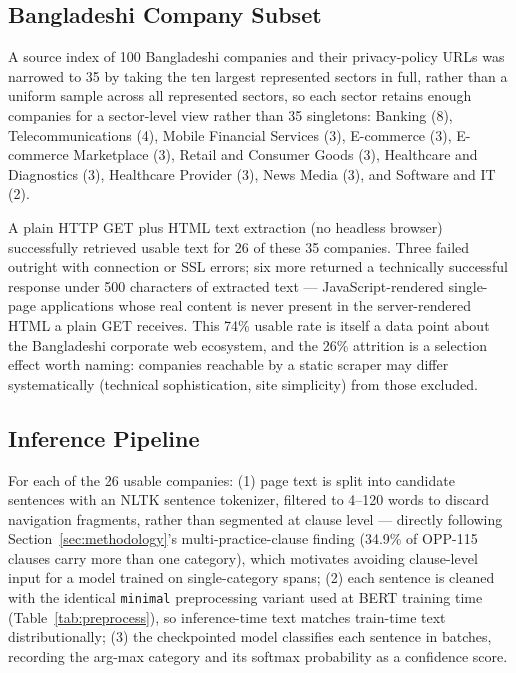 \documentclass[11pt]{article}
\begin{document}
\subsection{Bangladeshi Company Subset}

A source index of 100 Bangladeshi companies and their privacy-policy URLs was narrowed to 35 by taking the ten largest represented sectors in full, rather than a uniform sample across all represented sectors, so each sector retains enough companies for a sector-level view rather than 35 singletons: Banking (8), Telecommunications (4), Mobile Financial Services (3), E-commerce (3), E-commerce Marketplace (3), Retail and Consumer Goods (3), Healthcare and Diagnostics (3), Healthcare Provider (3), News Media (3), and Software and IT (2).

A plain HTTP GET plus HTML text extraction (no headless browser) successfully retrieved usable text for 26 of these 35 companies. Three failed outright with connection or SSL errors; six more returned a technically successful response under 500 characters of extracted text --- JavaScript-rendered single-page applications whose real content is never present in the server-rendered HTML a plain GET receives. This 74\% usable rate is itself a data point about the Bangladeshi corporate web ecosystem, and the 26\% attrition is a selection effect worth naming: companies reachable by a static scraper may differ systematically (technical sophistication, site simplicity) from those excluded.

\subsection{Inference Pipeline}

For each of the 26 usable companies: (1) page text is split into candidate sentences with an NLTK sentence tokenizer, filtered to 4--120 words to discard navigation fragments, rather than segmented at clause level --- directly following Section~\ref{sec:methodology}'s multi-practice-clause finding (34.9\% of OPP-115 clauses carry more than one category), which motivates avoiding clause-level input for a model trained on single-category spans; (2) each sentence is cleaned with the identical \texttt{minimal} preprocessing variant used at BERT training time (Table~\ref{tab:preprocess}), so inference-time text matches train-time text distributionally; (3) the checkpointed model classifies each sentence in batches, recording the arg-max category and its softmax probability as a confidence score.
\end{document}
